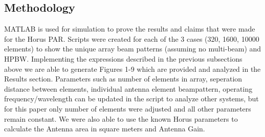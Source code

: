 \documentclass[conference]{IEEEtran}
\begin{document}
\subsection{Methodology}
\par MATLAB is used for simulation to prove the results and claims that were made for the Horus PAR. Scripts were created for each of the 3 cases (320, 1600, 10000 elements) to show the unique array beam patterns (assuming no multi-beam) and HPBW. Implementing the expressions described in the previous subsections above we are able to generate Figures 1-9 which are provided and analyzed in the Results section. Parameters such as number of elements in array, seperation distance between elements, individual antenna element beampattern, operating frequency/wavelength can be updated in the script to analyze other systems, but for this paper only number of elements were adjusted and all other parameters remain constant. We were also able to use the known Horus parameters to calculate the Antenna area in square meters and Antenna Gain. 
\end{document}
